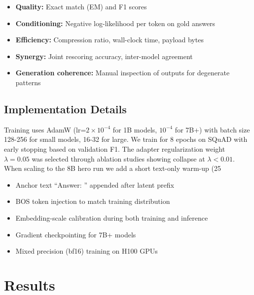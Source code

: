 \documentclass{article}
\begin{document}
\begin{itemize}
\item \textbf{Quality:} Exact match (EM) and F1 scores
\item \textbf{Conditioning:} Negative log-likelihood per token on gold answers
\item \textbf{Efficiency:} Compression ratio, wall-clock time, payload bytes
\item \textbf{Synergy:} Joint rescoring accuracy, inter-model agreement
\item \textbf{Generation coherence:} Manual inspection of outputs for degenerate patterns
\end{itemize}

\subsection{Implementation Details}

Training uses AdamW (lr=$2 \times 10^{-4}$ for 1B models, $10^{-4}$ for 7B+) with batch size 128-256 for small models, 16-32 for large. We train for 8 epochs on SQuAD with early stopping based on validation F1. The adapter regularization weight $\lambda=0.05$ was selected through ablation studies showing collapse at $\lambda < 0.01$. When scaling to the 8B hero run we add a short text-only warm-up (25%
\begin{itemize}
\item Anchor text ``Answer: '' appended after latent prefix
\item BOS token injection to match training distribution
\item Embedding-scale calibration during both training and inference
\item Gradient checkpointing for 7B+ models
\item Mixed precision (bf16) training on H100 GPUs
\end{itemize}

\section{Results}
\end{document}
